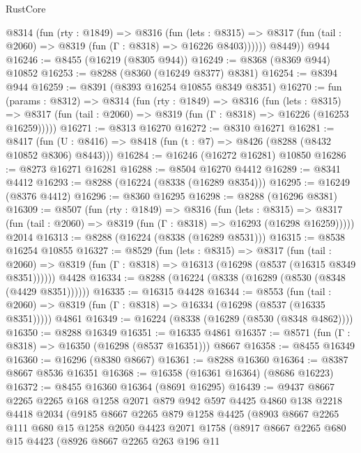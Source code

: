 \begin{lexlean}{RustCore}
\begin{coremodule}
          @8314
            (fun (rty : @1849) =>
            @8316
              (fun (lets : @8315) =>
              @8317 (fun (tail : @2060) => @8319 (fun (Γ : @8318) => @16226 @8403))))))
        @8449))
    @944
@16246 := @8455 (@16219 (@8305 @944))
@16249 := @8368 (@8369 @944) @10852
@16253 := @8288 (@8360 (@16249 @8377) @8381)
@16254 := @8394 @944
@16259 := @8391 (@8393 @16254 @10855 @8349 @8351)
@16270 := fun (params : @8312) =>
  @8314
    (fun (rty : @1849) =>
    @8316
      (fun (lets : @8315) =>
      @8317 (fun (tail : @2060) => @8319 (fun (Γ : @8318) => @16226 (@16253 @16259)))))
@16271 := @8313 @16270
@16272 := @8310 @16271
@16281 := @8417
    (fun (U : @8416) => @8418 (fun (t : @7) => @8426 (@8288 (@8432 @10852 @8306) @8443)))
@16284 := @16246 (@16272 @16281) @10850
@16286 := @8273 @16271 @16281
@16288 := @8504 @16270 @4412
@16289 := @8341 @4412
@16293 := @8288 (@16224 (@8338 (@16289 @8354)))
@16295 := @16249 (@8376 @4412)
@16296 := @8360 @16295
@16298 := @8288 (@16296 @8381)
@16309 := @8507
    (fun (rty : @1849) =>
    @8316
      (fun (lets : @8315) =>
      @8317 (fun (tail : @2060) => @8319 (fun (Γ : @8318) => @16293 (@16298 @16259)))))
    @2014
@16313 := @8288 (@16224 (@8338 (@16289 @8531)))
@16315 := @8538 @16254 @10855
@16327 := @8529
    (fun (lets : @8315) =>
    @8317
      (fun (tail : @2060) =>
      @8319 (fun (Γ : @8318) => @16313 (@16298 (@8537 (@16315 @8349 @8351))))))
    @4428
@16334 := @8288 (@16224 (@8338 (@16289 (@8530 (@8348 (@4429 @8351))))))
@16335 := @16315 @4428
@16344 := @8553
    (fun (tail : @2060) => @8319 (fun (Γ : @8318) => @16334 (@16298 (@8537 (@16335 @8351)))))
    @4861
@16349 := @16224 (@8338 (@16289 (@8530 (@8348 @4862))))
@16350 := @8288 @16349
@16351 := @16335 @4861
@16357 := @8571 (fun (Γ : @8318) => @16350 (@16298 (@8537 @16351))) @8667
@16358 := @8455 @16349
@16360 := @16296 (@8380 @8667)
@16361 := @8288 @16360
@16364 := @8387 @8667 @8536 @16351
@16368 := @16358 (@16361 @16364) (@8686 @16223)
@16372 := @8455 @16360 @16364 (@8691 @16295)
@16439 := @9437
    @8667
    @2265
    @2265
    @168
    @1258
    @2071
    @879
    @942
    @597
    @4425
    @4860
    @138
    @2218
    @4418
    @2034
    (@9185
      @8667
      @2265
      @879
      @1258
      @4425
      (@8903
        @8667
        @2265
        @111
        @680
        @15
        @1258
        @2050
        @4423
        @2071
        @1758
        (@8917
          @8667
          @2265
          @680
          @15
          @4423
          (@8926
            @8667
            @2265
            @263
            @196
            @11

\end{coremodule}
\end{lexlean}

